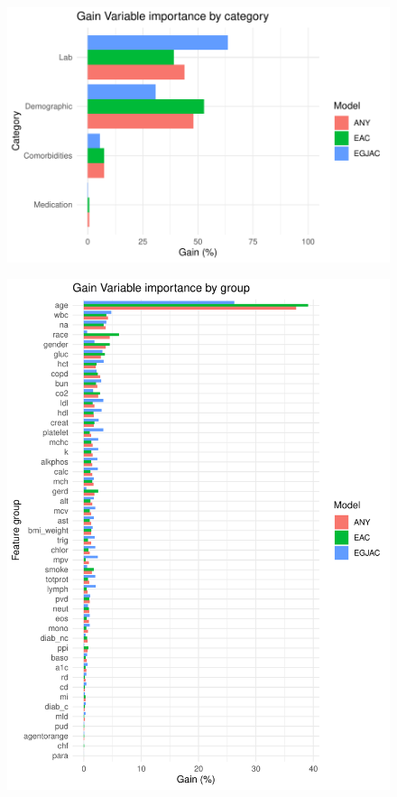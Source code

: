 \documentclass[english]{article}
\begin{document}
\begin{figure}[ht]
\includegraphics[width=0.8\linewidth]{variable_importance/vi_cat.pdf}
\end{figure}
\begin{figure}[ht]
\includegraphics[width=0.8\linewidth]{variable_importance/vi_group.pdf}
\end{figure}
\end{document}
